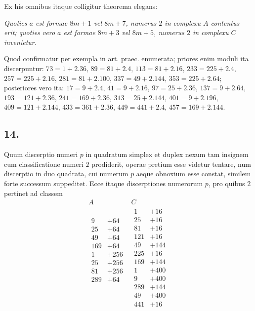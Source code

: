 \documentclass[twoside,12pt]{memoir}
\begin{document}
Ex his omnibus itaque colligitur theorema elegans:
 
\textit{Quoties \(a\) est formae \(8 m+1\) vel \(8 m+7\), numerus \(2\) in complexu \(A\) contentus erit; quoties vero \(a\) est formae \(8 m+3\) vel \(8 m+5\), numerus \(2\) in complexu \(C\) invenietur.}
 
Quod confirmatur per exempla in art. praec. enumerata; priores enim moduli ita discerpuntur: \(73=1+2.36\), \(89=81+2.4\), \(113=81+2.16\), \(233=225+2.4\), \(257=225+2.16\), \(281=81+2.100\), \(337=49+2.144\), \(353=225+2.64\); posteriores vero ita: \(17=9+2.4\), \(41=9+2.16\), \(97=25+2.36\), \(137=9+2.64\), \(193=121+2.36\), \(241=169+2.36\), \(313=25+2.144\), \(401=9+2.196\), \(409=121+2.144\), \(433=361+2.36\), \(449=441+2.4\), \(457=169+2.144\).

\subsection*{14.}
 
Quum discerptio numeri \(p\) in quadratum simplex et duplex nexum tam insignem cum classificatione numeri \(2\) prodiderit, operae pretium esse videtur tentare, num discerptio in duo quadrata, cui numerum \(p\) aeque obnoxium esse constat, similem forte successum suppeditet. Ecce itaque discerptiones numerorum \(p\), pro quibus \(2\) pertinet ad classem
\[\begin{array}{c|c}
A & C  \\[2pt]
\hline 
\begin{aligned}
9&+64  \\
25&+64  \\
49&+64 \\
169&+64\\
1&+256 \\
25&+256\\
81&+256\\
289&+64\\
\\
\\
\\
\\
 \end{aligned}
&
\begin{aligned}
 1&+16\\
 25&+16\\
 81&+16\\
 121&+16\\
 49&+144\\
225&+16\\
 169&+144\\
 1&+400\\
9&+400\\
289&+144\\
49&+400\\
441&+16 
\end{aligned}
\end{array}\]\pagebreak%
\end{document}
